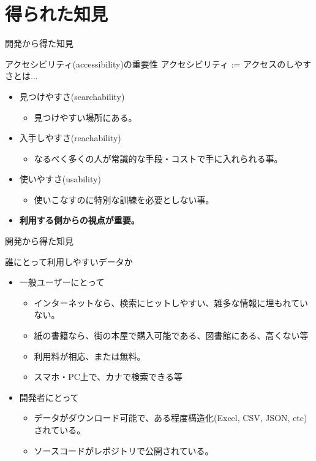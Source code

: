 \documentclass[14pt]{beamer}
\begin{document}
\section{得られた知見}
\begin{frame}{開発から得た知見}
  \begin{block}{アクセシビリティ(accessibility)の重要性}%
    \vspace{0pt}
    アクセシビリティ := アクセスのしやすさとは...
    \begin{itemize}
    \item 見つけやすさ(searchability)
      \begin{itemize}
      \item 見つけやすい場所にある。
      \end{itemize}
    \item 入手しやすさ(reachability)
      \begin{itemize}
      \item なるべく多くの人が常識的な手段・コストで手に入れられる事。
      \end{itemize}
    \item 使いやすさ(usability)
      \begin{itemize}
      \item 使いこなすのに特別な訓練を必要としない事。
      \end{itemize}
    \item \textbf{利用する側からの視点が重要。}
    \end{itemize}
  \end{block}
\end{frame}

\begin{frame}{開発から得た知見}
  \begin{block}{誰にとって利用しやすいデータか}
    \begin{itemize}
    \item 一般ユーザーにとって
      \begin{itemize}
      \item インターネットなら、検索にヒットしやすい、雑多な情報に埋もれていない。        
      \item 紙の書籍なら、街の本屋で購入可能である、図書館にある、高くない等
      \item 利用料が相応、または無料。
      \item スマホ・PC上で、カナで検索できる等
      \end{itemize}
    \item 開発者にとって
      \begin{itemize}
      \item データがダウンロード可能で、ある程度構造化(Excel, CSV, JSON, etc)されている。
      \item ソースコードがレポジトリで公開されている。
      \end{itemize}
    \end{itemize}
  \end{block}
\end{frame}
\end{document}
